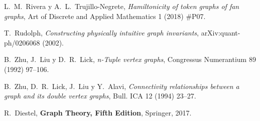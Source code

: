 \begin{thebibliography}{99}
  L.~M.~Rivera y A.~L.~Trujillo-Negrete,
  \textit{Hamiltonicity of token graphs of fan graphs},
  Art of Discrete and Applied Mathematics 1 (2018) \#P07. 

T.~Rudolph,
 \textit{Constructing physically intuitive graph invariants},
 arXiv:quant-ph/0206068 (2002).

  B.~Zhu, J.~Liu y D.~R.~Lick,
 \textit{n-Tuple vertex graphs},
 Congressus Numerantium 89 (1992) 97--106.

  B.~Zhu, D.~R.~Lick, J.~Liu y Y.~Alavi,
 \textit{Connectivity relationships between a graph and
 its double vertex graphs},
 Bull. ICA 12 (1994) 23--27.


  R.~Diestel,
  \textbf{Graph Theory, Fifth Edition},
  Springer, 2017.

\end{thebibliography}
